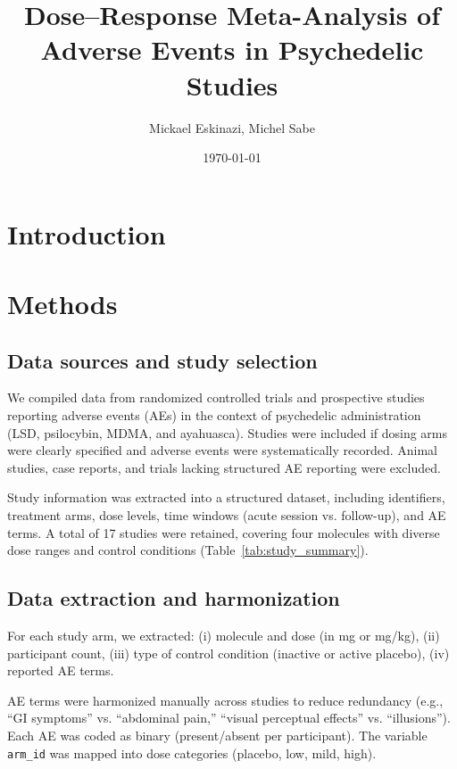 \documentclass[12pt,a4paper]{article}
\title{Dose–Response Meta-Analysis of Adverse Events in Psychedelic Studies}
\author{Mickael Eskinazi, Michel Sabe}
\date{\today}
\begin{document}
\maketitle

\begin{abstract}

\end{abstract}

\section{Introduction}


\section{Methods}

\subsection{Data sources and study selection}
We compiled data from randomized controlled trials and prospective studies reporting adverse events (AEs) in the context of psychedelic administration (LSD, psilocybin, MDMA, and ayahuasca). Studies were included if dosing arms were clearly specified and adverse events were systematically recorded. Animal studies, case reports, and trials lacking structured AE reporting were excluded.  

Study information was extracted into a structured dataset, including identifiers, treatment arms, dose levels, time windows (acute session vs. follow-up), and AE terms. A total of 17 studies were retained, covering four molecules with diverse dose ranges and control conditions (Table~\ref{tab:study_summary}).  

\subsection{Data extraction and harmonization}
For each study arm, we extracted:  
(i) molecule and dose (in mg or mg/kg),  
(ii) participant count,  
(iii) type of control condition (inactive or active placebo),  
(iv) reported AE terms.  

AE terms were harmonized manually across studies to reduce redundancy (e.g., “GI symptoms” vs. “abdominal pain,” “visual perceptual effects” vs. “illusions”). Each AE was coded as binary (present/absent per participant). The variable \texttt{arm\_id} was mapped into dose categories (placebo, low, mild, high).  
\end{document}
